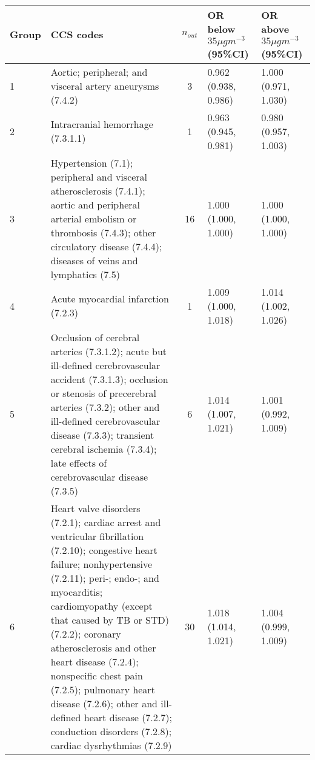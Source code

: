 \begin{tabular}{lp{7.8cm}cp{2.2cm}p{2.2cm}}
  \hline
Group & CCS codes & $n_{out}$ & OR below $35 \mu g m^{-3}$ (95\%CI) & OR above $35 \mu g m^{-3}$ (95\%CI) \\ 
  \hline
   1 & Aortic; peripheral; and visceral artery aneurysms (7.4.2) &    3 & 0.962 (0.938, 0.986) & 1.000 (0.971, 1.030) \\ 
     2 & Intracranial hemorrhage (7.3.1.1) &    1 & 0.963 (0.945, 0.981) & 0.980 (0.957, 1.003) \\ 
     3 & Hypertension (7.1); peripheral and visceral atherosclerosis (7.4.1); aortic and peripheral arterial embolism or thrombosis (7.4.3); other circulatory disease (7.4.4); diseases of veins and lymphatics (7.5) &   16 & 1.000 (1.000, 1.000) & 1.000 (1.000, 1.000) \\ 
     4 & Acute myocardial infarction (7.2.3) &    1 & 1.009 (1.000, 1.018) & 1.014 (1.002, 1.026) \\ 
     5 & Occlusion of cerebral arteries (7.3.1.2); acute but ill-defined cerebrovascular accident (7.3.1.3); occlusion or stenosis of precerebral arteries (7.3.2); other and ill-defined cerebrovascular disease (7.3.3); transient cerebral ischemia (7.3.4); late effects of cerebrovascular disease (7.3.5) &    6 & 1.014 (1.007, 1.021) & 1.001 (0.992, 1.009) \\ 
     6 & Heart valve disorders (7.2.1); cardiac arrest and ventricular fibrillation (7.2.10); congestive heart failure; nonhypertensive (7.2.11); peri-; endo-; and myocarditis; cardiomyopathy (except that caused by TB or STD) (7.2.2); coronary atherosclerosis and other heart disease (7.2.4); nonspecific chest pain (7.2.5); pulmonary heart disease (7.2.6); other and ill-defined heart disease (7.2.7); conduction disorders (7.2.8); cardiac dysrhythmias (7.2.9) &   30 & 1.018 (1.014, 1.021) & 1.004 (0.999, 1.009) \\ 
   \hline
\end{tabular}

